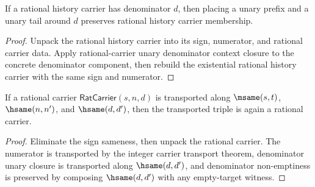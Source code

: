 \begin{theorem}
\label{thm:rat-history-carrier-unary-denominator-context-closed}
If a rational history carrier has denominator \(d\), then placing a unary
prefix and a unary tail around \(d\) preserves rational history carrier
membership.
\end{theorem}
\begin{proof}
Unpack the rational history carrier into its sign, numerator, and rational
carrier data. Apply rational-carrier unary denominator context closure to the
concrete denominator component, then rebuild the existential rational history
carrier with the same sign and numerator.
\end{proof}

\begin{theorem}
\label{thm:rat-carrier-hsame-transport}
If a rational carrier \(\mathsf{RatCarrier}(s,n,d)\) is transported along
\(\msame(s,t)\), \(\hsame(n,n')\), and \(\hsame(d,d')\), then the transported
triple is again a rational carrier.
\end{theorem}
\begin{proof}
Eliminate the sign sameness, then unpack the rational carrier. The numerator
is transported by the integer carrier transport theorem, denominator unary
closure is transported along \(\hsame(d,d')\), and denominator non-emptiness is
preserved by composing \(\hsame(d,d')\) with any empty-target witness.
\end{proof}
